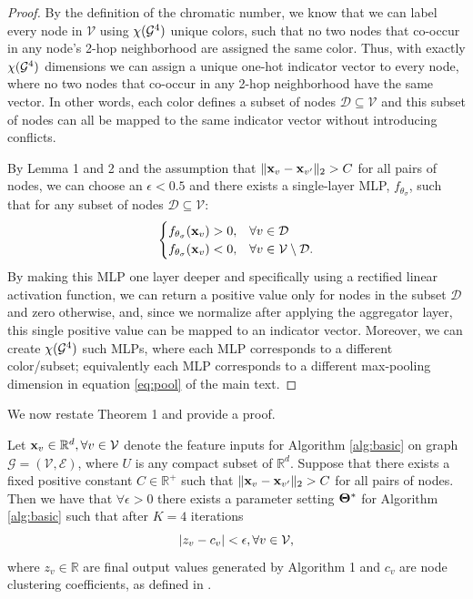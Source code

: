 \begin{proof}
By the definition of the chromatic number, we know that we can label every node in $\mathcal{V}$ using $\chi(\mathcal{G}^4)$ unique colors, such that no two nodes that co-occur in any node's 2-hop neighborhood are assigned the same color. 
Thus, with exactly $\chi(\mathcal{G}^4)$ dimensions we can assign a unique one-hot indicator vector to every node, where no two nodes that co-occur in any 2-hop neighborhood have the same vector. 
In other words, each color defines a subset of nodes $\mathcal{D} \subseteq \mathcal{V}$ and this subset of nodes can all be mapped to the same indicator vector without introducing conflicts. 

By Lemma 1 and 2 and the assumption that $\|\mathbf{x}_v  - \mathbf{x}_{v'}\|_2 > C$ for all pairs of nodes, we can choose an $\epsilon < 0.5$ and there exists a single-layer MLP, $f_{\theta_\sigma}$, such that for any subset of nodes $\mathcal{D} \subseteq \mathcal{V}$:
\begin{equation}
\begin{cases}
f_{\theta_\sigma}(\mathbf{x}_v) > 0 ,&\forall v \in \mathcal{D}\\
f_{\theta_\sigma}(\mathbf{x}_v) < 0,& \forall v \in \mathcal{V} \setminus \mathcal{D}.
\end{cases}
\end{equation}
By making this MLP one layer deeper and specifically using a rectified linear activation function, we can return a positive value only for nodes in the subset $\mathcal{D}$ and zero otherwise, and, since we normalize after applying the aggregator layer, this single positive value can be mapped to an indicator vector. 
Moreover, we can create $\chi(\mathcal{G}^4)$ such MLPs, where each MLP corresponds to a different color/subset; equivalently each MLP corresponds to a different max-pooling dimension in equation \ref{eq:pool} of the main text. 
\end{proof}



We now restate Theorem 1 and provide a proof. 

\renewcommand{\thetheorem}{\ref{thm:main}}
\begin{theorem}
Let $\mathbf{x}_v \in \mathbb{R}^d, \forall v \in \mathcal{V}$ denote the feature inputs for Algorithm \ref{alg:basic} on graph $\mathcal{G}=(\mathcal{V}, \mathcal{E})$, where $U$ is any compact subset of $\mathbb{R}^d$. Suppose that there exists a fixed positive constant $C \in \mathbb{R}^+$ such that $\|\mathbf{x}_v  - \mathbf{x}_{v'}\|_2 > C$ for all pairs of nodes. Then we have that $\forall \epsilon > 0$ there exists a parameter setting $\mathbf{\Theta}^*$ for Algorithm \ref{alg:basic} such that after $K=4$ iterations 
$$|{z}_v - c_v| < \epsilon , \forall v \in \mathcal{\mathcal{V}},$$ where $z_v \in \mathbb{R}$ are final output values generated by Algorithm 1 and $c_v$ are node clustering coefficients, as defined in \cite{watts1998collective}. 
\end{theorem}

